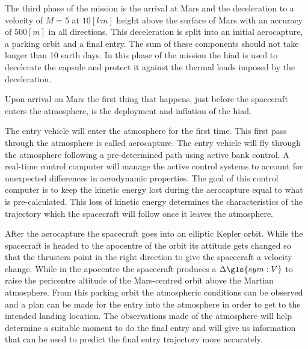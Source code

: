 The third phase of the mission is the arrival at Mars and the deceleration to a velocity of $M=5$ at $10 \left[km\right]$ height above the surface of Mars with an accuracy of $500 \left[m\right]$ in all directions. This deceleration is split into an initial aerocapture, a parking orbit and a final entry. The sum of these components should not take longer than 10 earth days. In this phase of the mission the \gls{hiad} is used to decelerate the capsule and protect it against the thermal loads imposed by the deceleration.

Upon arrival on Mars the first thing that happens, just before the spacecraft enters the atmosphere, is the deployment and inflation of the \gls{hiad}. %

The entry vehicle will enter the atmosphere for the first time. This first pass through the atmosphere is called aerocapture. The entry vehicle will fly through the atmosphere following a pre-determined path using active bank control. A real-time control computer will manage the active control systems to account for unexpected differences in aerodynamic properties. The goal of this control computer is to keep the kinetic energy lost during the aerocapture equal to what is pre-calculated. This loss of kinetic energy determines the characteristics of the trajectory which the spacecraft will follow once it leaves the atmosphere. %

After the aerocapture the spacecraft goes into an elliptic Kepler orbit. While the spacecraft is headed to the apocentre of the orbit its attitude gets changed so that the thrusters point in the right direction to give the spacecraft a velocity change. While in the apocentre the spacecraft produces a $\Delta\gls{sym:V}$ to raise the pericentre altitude of the Mars-centred orbit above the Martian atmosphere.
From this parking orbit the atmospheric conditions can be observed and a plan can be made for the entry into the atmosphere in order to get to the intended landing location. The observations made of the atmosphere will help determine a suitable moment to do the final entry and will give us information that can be used to predict the final entry trajectory more accurately.

